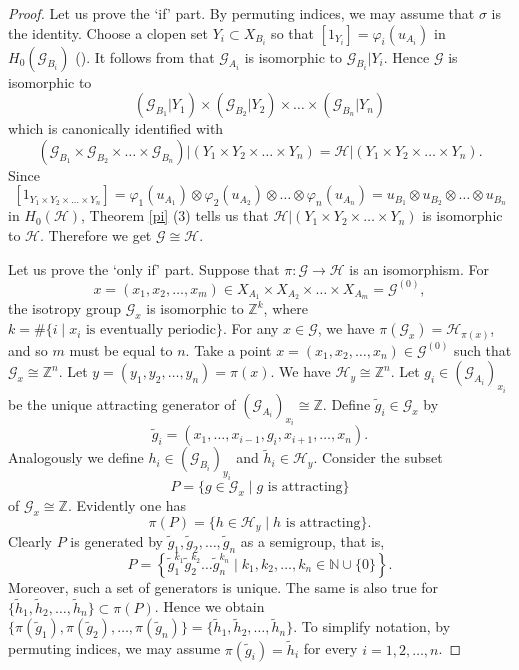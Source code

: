 \documentclass[11pt]{article}
\theoremstyle{definition}
\numberwithin{equation}{section}
\renewcommand{\phi}{\varphi}
\newcommand{\G}{\mathcal{G}}
\renewcommand{\H}{\mathcal{H}}
\newcommand{\N}{\mathbb{N}}
\newcommand{\Z}{\mathbb{Z}}
\begin{document}
\begin{proof}
Let us prove the `if' part. 
By permuting indices, we may assume that $\sigma$ is the identity. 
Choose a clopen set $Y_i\subset X_{B_i}$ 
so that $[1_{Y_i}]=\phi_i(u_{A_i})$ in $H_0(\G_{B_i})$ 
(\cite[Lemma 5.3]{M15crelle}). 
It follows from \cite[Theorem 6.2]{M15crelle} that 
$\G_{A_i}$ is isomorphic to $\G_{B_i}|Y_i$. 
Hence $\G$ is isomorphic to 
\[
(\G_{B_1}|Y_1)\times(\G_{B_2}|Y_2)\times\dots\times(\G_{B_n}|Y_n)
\]
which is canonically identified with 
\[
(\G_{B_1}\times\G_{B_2}\times\dots\times\G_{B_n})
|(Y_1\times Y_2\times\dots\times Y_n)
=\H|(Y_1\times Y_2\times\dots\times Y_n). 
\]
Since 
\[
[1_{Y_1\times Y_2\times\dots\times Y_n}]
=\phi_1(u_{A_1})\otimes\phi_2(u_{A_2})\otimes\dots
\otimes\phi_n(u_{A_n})
=u_{B_1}\otimes u_{B_2}\otimes\dots\otimes u_{B_n}
\]
in $H_0(\H)$, 
Theorem \ref{pi} (3) tells us that 
$\H|(Y_1\times Y_2\times\dots\times Y_n)$ is isomorphic to $\H$. 
Therefore we get $\G\cong\H$. 

Let us prove the `only if' part. 
Suppose that $\pi:\G\to\H$ is an isomorphism. 
For 
\[
x=(x_1,x_2,\dots,x_m)\in X_{A_1}\times X_{A_2}\times\dots\times X_{A_m}
=\G^{(0)}, 
\]
the isotropy group $\G_x$ is isomorphic to $\Z^k$, 
where $k=\#\{i\mid\text{$x_i$ is eventually periodic}\}$. 
For any $x\in\G$, we have $\pi(\G_x)=\H_{\pi(x)}$, 
and so $m$ must be equal to $n$. 
Take a point $x=(x_1,x_2,\dots,x_n)\in\G^{(0)}$ such that $\G_x\cong\Z^n$. 
Let $y=(y_1,y_2,\dots,y_n)=\pi(x)$. 
We have $\H_y\cong\Z^n$. 
Let $g_i\in(\G_{A_i})_{x_i}$ be the unique attracting generator 
of $(\G_{A_i})_{x_i}\cong\Z$. 
Define $\tilde g_i\in\G_x$ by 
\[
\tilde g_i=(x_1,\dots,x_{i-1},g_i,x_{i+1},\dots,x_n). 
\]
Analogously we define $h_i\in(\G_{B_i})_{y_i}$ and $\tilde h_i\in\H_y$. 
Consider the subset 
\[
P=\{g\in\G_x\mid\text{$g$ is attracting}\}
\]
of $\G_x\cong\Z$. 
Evidently one has 
\[
\pi(P)=\{h\in\H_y\mid\text{$h$ is attracting}\}. 
\]
Clearly 
$P$ is generated by $\tilde g_1,\tilde g_2,\dots,\tilde g_n$ as a semigroup, 
that is, 
\[
P=\left\{\tilde g_1^{k_1}\tilde g_2^{k_2}\dots\tilde g_n^{k_n}
\mid k_1,k_2,\dots,k_n\in\N\cup\{0\}\right\}. 
\]
Moreover, such a set of generators is unique. 
The same is also true 
for $\{\tilde h_1,\tilde h_2,\dots,\tilde h_n\}\subset\pi(P)$. 
Hence we obtain 
$\{\pi(\tilde g_1),\pi(\tilde g_2),\dots,\pi(\tilde g_n)\}
=\{\tilde h_1,\tilde h_2,\dots,\tilde h_n\}$. 
To simplify notation, by permuting indices, 
we may assume $\pi(\tilde g_i)=\tilde h_i$ for every $i=1,2,\dots,n$. 


\end{proof}
\end{document}

